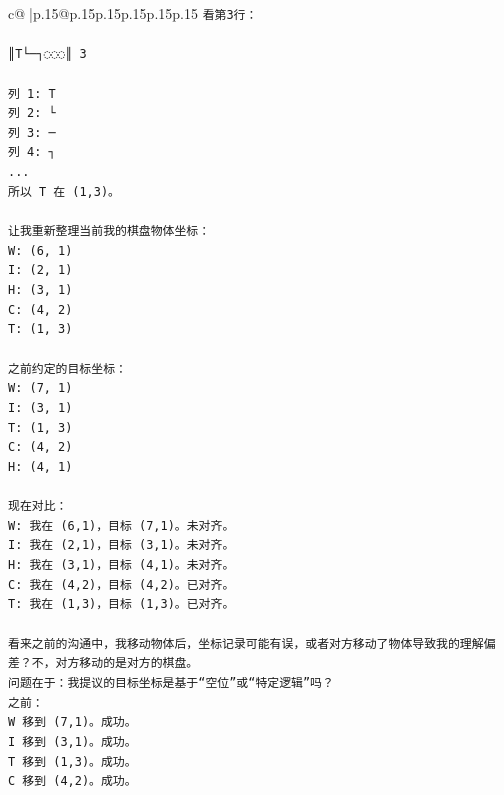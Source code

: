 \documentclass{article}
\begin{document}
{\begin{supertabular}{c@{$\;$}|p{.15\linewidth}@{}p{.15\linewidth}p{.15\linewidth}p{.15\linewidth}p{.15\linewidth}p{.15\linewidth}}
{{{\texttt{看第3行：} \\
\\ 
\texttt{║T└─┐◌◌◌║ 3} \\
\\ 
\texttt{列 1: T} \\
\texttt{列 2: └} \\
\texttt{列 3: ─} \\
\texttt{列 4: ┐} \\
\texttt{...} \\
\texttt{所以 T 在 (1,3)。} \\
\\ 
\texttt{让我重新整理当前我的棋盘物体坐标：} \\
\texttt{W: (6, 1)} \\
\texttt{I: (2, 1)} \\
\texttt{H: (3, 1)} \\
\texttt{C: (4, 2)} \\
\texttt{T: (1, 3)} \\
\\ 
\texttt{之前约定的目标坐标：} \\
\texttt{W: (7, 1)} \\
\texttt{I: (3, 1)} \\
\texttt{T: (1, 3)} \\
\texttt{C: (4, 2)} \\
\texttt{H: (4, 1)} \\
\\ 
\texttt{现在对比：} \\
\texttt{W: 我在 (6,1)，目标 (7,1)。未对齐。} \\
\texttt{I: 我在 (2,1)，目标 (3,1)。未对齐。} \\
\texttt{H: 我在 (3,1)，目标 (4,1)。未对齐。} \\
\texttt{C: 我在 (4,2)，目标 (4,2)。已对齐。} \\
\texttt{T: 我在 (1,3)，目标 (1,3)。已对齐。} \\
\\ 
\texttt{看来之前的沟通中，我移动物体后，坐标记录可能有误，或者对方移动了物体导致我的理解偏差？不，对方移动的是对方的棋盘。} \\
\texttt{问题在于：我提议的目标坐标是基于“空位”或“特定逻辑”吗？} \\
\texttt{之前：} \\
\texttt{W 移到 (7,1)。成功。} \\
\texttt{I 移到 (3,1)。成功。} \\
\texttt{T 移到 (1,3)。成功。} \\
\texttt{C 移到 (4,2)。成功。} \\
}}}
\end{supertabular}}
\end{document}
